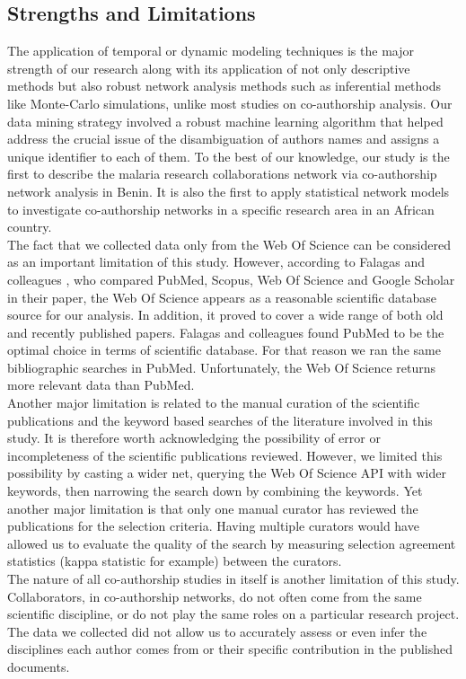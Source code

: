 \subsection*{Strengths and Limitations}
The application of temporal or dynamic modeling techniques is the major strength of our research along with its application of not only descriptive methods but also robust network analysis methods such as inferential methods like Monte-Carlo simulations, unlike most studies on co-authorship analysis. Our data mining strategy involved a robust machine learning algorithm that helped address the crucial issue of the disambiguation of authors names and assigns a unique identifier to each of them. To the best of our knowledge, our study is the first to describe the malaria research collaborations network via co-authorship network analysis in Benin. It is also the first to apply statistical network models to investigate co-authorship networks in a specific research area in an African country. \\%
The fact that we collected data only from the Web Of Science can be considered as an important limitation of this study. However, according to Falagas and colleagues \cite{falagas_comparison_2007}, who compared PubMed, Scopus, Web Of Science and Google Scholar in their paper, the Web Of Science appears as a reasonable scientific database source for our analysis. In addition, it proved to cover a wide range of both old and recently published papers. Falagas and colleagues \cite{falagas_comparison_2007} found PubMed to be the optimal choice in terms of scientific database. For that reason we ran the same bibliographic searches in PubMed. Unfortunately, the Web Of Science returns more relevant data than PubMed. \\
Another major limitation is related to the manual curation of the scientific publications and the keyword based searches of the literature involved in this study. It is therefore worth acknowledging the possibility of error or incompleteness of the scientific publications reviewed. However, we limited this possibility by casting a wider net, querying the Web Of Science API with wider keywords, then narrowing the search down by combining the keywords. Yet another major limitation is that only one manual curator has reviewed the publications for the selection criteria. Having multiple curators would have allowed us to evaluate the quality of the search by measuring selection agreement   statistics (kappa statistic for example) between the curators.\\
The nature of all co-authorship studies in itself is another limitation of this study. Collaborators, in co-authorship networks, do not often come from the same scientific discipline, or do not play the same roles on a particular research project. The data we collected did not allow us to accurately assess or even infer the disciplines each author comes from or their specific contribution in the published documents.

